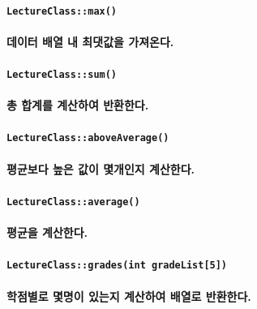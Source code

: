 \documentclass[UTF8]{report}
\begin{document}
            \paragraph{\texttt{LectureClass::max()}}
            \paragraph{%
                \normalfont 데이터 배열 내 최댓값을 가져온다.
            }

            \paragraph{\texttt{LectureClass::sum()}}
            \paragraph{%
                \normalfont 총 합계를 계산하여 반환한다.
            }

            \paragraph{\texttt{LectureClass::aboveAverage()}}
            \paragraph{%
                \normalfont 평균보다 높은 값이 몇개인지 계산한다.
            }

            \paragraph{\texttt{LectureClass::average()}}
            \paragraph{%
                \normalfont 평균을 계산한다.
            }

            \paragraph{\texttt{LectureClass::grades(int gradeList[5])}}
            \paragraph{%
                \normalfont 학점별로 몇명이 있는지 계산하여 배열로 반환한다.
            }
\end{document}
